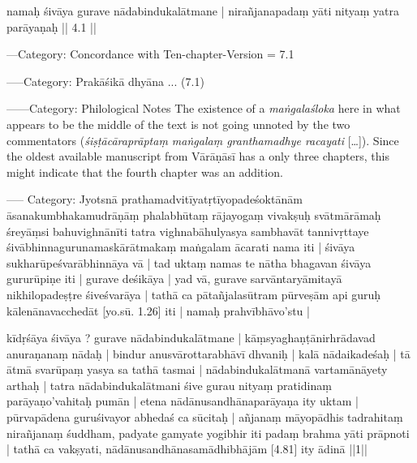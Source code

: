 \documentclass[12pt]{article}
\begin{document}
\begin{otherlanguage}{iast}
\begin{ekdosis}
\begin{ekdverse}        

namaḥ śivāya gurave nādabindukalātmane  |
nirañjanapadaṃ yāti nityaṃ yatra parāyaṇaḥ  || 4.1 ||



—Category: Concordance with Ten-chapter-Version    = 7.1

—–Category: Prakāśikā
dhyāna ...    (7.1)


——Category: Philological Notes
The existence of a \emph{maṅgalaśloka} here in what appears to be the middle of the text is not
going unnoted by the two commentators (\emph{śiṣṭācāraprāptaṃ maṅgalaṃ granthamadhye racayati}
[\ldots]). Since the oldest available manuscript from Vārāṇāsī has a only three chapters, this
might indicate that the fourth chapter was an addition. 

—– Category: Jyotsnā
prathamadvitīyatṛtīyopadeśoktānām āsanakumbhakamudrāṇāṃ phalabhūtaṃ
rājayogaṃ vivakṣuḥ svātmārāmaḥ śreyāṃsi bahuvighnānīti tatra vighnabāhulyasya sambhavāt
tannivṛttaye śivābhinnagurunamaskārātmakaṃ maṅgalam ācarati nama iti | śivāya
sukharūpeśvarābhinnāya vā | tad uktaṃ namas te nātha bhagavan śivāya gururūpiṇe iti | gurave
deśikāya | yad vā, gurave sarvāntaryāmitayā nikhilopadeṣṭre śiveśvarāya | tathā ca
pātañjalasūtram pūrveṣām api guruḥ kālenānavacchedāt [yo.sū. 1.26] iti | namaḥ prahvībhāvo'stu |

kīdṛśāya śivāya ? gurave nādabindukalātmane | kāṃsyaghaṇṭānirhrādavad anuraṇanaṃ nādaḥ | bindur
anusvārottarabhāvī dhvaniḥ | kalā nādaikadeśaḥ | tā ātmā svarūpaṃ yasya sa tathā tasmai |
nādabindukalātmanā vartamānāyety arthaḥ | tatra nādabindukalātmani śive gurau nityaṃ pratidinaṃ
parāyaṇo'vahitaḥ pumān | etena nādānusandhānaparāyaṇa ity uktam | pūrvapādena guruśivayor
abhedaś ca sūcitaḥ | añjanaṃ māyopādhis tadrahitaṃ nirañjanaṃ śuddham, padyate gamyate yogibhir
iti padaṃ brahma yāti prāpnoti | tathā ca vakṣyati, nādānusandhānasamādhibhājām [4.81] ity ādinā
||1||





\end{ekdverse}
\end{ekdosis}
\end{otherlanguage}
\end{document}
